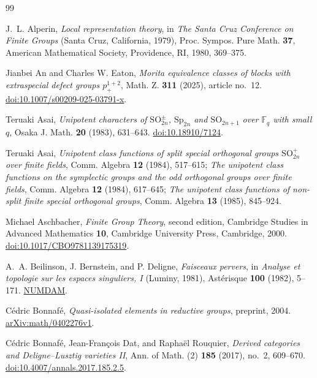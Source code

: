 \begin{thebibliography}{99}
\raggedright

J.~L. Alperin,
\emph{Local representation theory},
in \emph{The Santa Cruz Conference on Finite Groups}
(Santa Cruz, California, 1979),
Proc. Sympos. Pure Math. \textbf{37},
American Mathematical Society, Providence, RI, 1980, 369--375.

Jianbei An and Charles W. Eaton,
\emph{Morita equivalence classes of blocks with extraspecial defect groups
\(p_+^{1+2}\)},
Math. Z. \textbf{311} (2025), article no.~12.
\href{https://doi.org/10.1007/s00209-025-03791-x}{doi:10.1007/s00209-025-03791-x}.

Teruaki Asai,
\emph{Unipotent characters of \(\mathrm{SO}_{2n}^{\pm}\),
\(\mathrm{Sp}_{2n}\) and \(\mathrm{SO}_{2n+1}\) over
\(\mathbb F_q\) with small \(q\)},
Osaka J. Math. \textbf{20} (1983), 631--643.
\href{https://doi.org/10.18910/7124}{doi:10.18910/7124}.

Teruaki Asai,
\emph{Unipotent class functions of split special orthogonal groups
\(\mathrm{SO}_{2n}^{+}\) over finite fields},
Comm. Algebra \textbf{12} (1984), 517--615;
\emph{The unipotent class functions on the symplectic groups and
the odd orthogonal groups over finite fields},
Comm. Algebra \textbf{12} (1984), 617--645;
\emph{The unipotent class functions of non-split finite special
orthogonal groups}, Comm. Algebra \textbf{13} (1985), 845--924.

Michael Aschbacher,
\emph{Finite Group Theory}, second edition,
Cambridge Studies in Advanced Mathematics \textbf{10},
Cambridge University Press, Cambridge, 2000.
\href{https://doi.org/10.1017/CBO9781139175319}{doi:10.1017/CBO9781139175319}.

A.~A. Beilinson, J. Bernstein, and P. Deligne,
\emph{Faisceaux pervers},
in \emph{Analyse et topologie sur les espaces singuliers, I}
(Luminy, 1981), Ast\'erisque \textbf{100} (1982), 5--171.
\href{https://www.numdam.org/item/AST_1982__100__1_0/}{NUMDAM}.

C\'edric Bonnaf\'e,
\emph{Quasi-isolated elements in reductive groups},
preprint, 2004.
\href{https://arxiv.org/abs/math/0402276v1}{arXiv:math/0402276v1}.

C\'edric Bonnaf\'e, Jean-Fran\c{c}ois Dat, and Rapha\"el Rouquier,
\emph{Derived categories and Deligne--Lusztig varieties II},
Ann. of Math. (2) \textbf{185} (2017), no.~2, 609--670.
\href{https://doi.org/10.4007/annals.2017.185.2.5}{doi:10.4007/annals.2017.185.2.5}.


\end{thebibliography}
